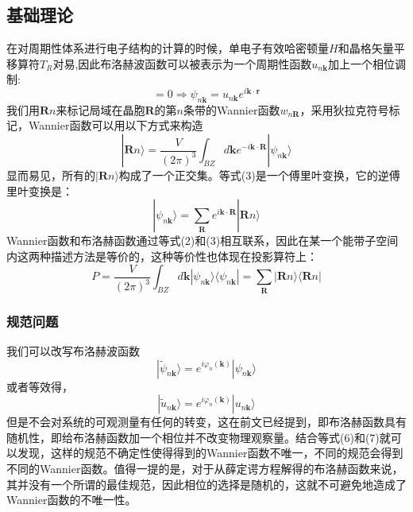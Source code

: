 \subsection{基础理论}
在对周期性体系进行电子结构的计算的时候，单电子有效哈密顿量$H$和晶格矢量平移算符$T_{R}$对易,因此布洛赫波函数可以被表示为一个周期性函数$u_{n\bm{k}}$加上一个相位调制:
\begin{equation}
[H,T_{R}]=0\Rightarrow \psi_{n\bm{k}}=u_{n\bm{k}}e^{i \bm{k} \cdot \bm{r}}
\end{equation}
我们用$\bm{R}n$来标记局域在晶胞$\bm{R}$的第$n$条带的Wannier函数$w_{n\bm{R}}$，采用狄拉克符号标记，Wannier函数可以用以下方式来构造
\begin{equation}
|\bm{R}n \rangle= \frac{V}{(2\pi)^3}\int_{BZ}d\bm{k}e^{-i\bm{k}\cdot\bm{R}}|\psi_{n\bm{k}}\rangle
\end{equation}
显而易见，所有的$|\bm{R}n \rangle$构成了一个正交集。等式(3)是一个傅里叶变换，它的逆傅里叶变换是：
\begin{equation}
|\psi_{n\bm{k}}\rangle= \sum_{\bm{R}}e^{i\bm{k}\cdot\bm{R}}|\bm{R}n \rangle
\end{equation}
Wannier函数和布洛赫函数通过等式(2)和(3)相互联系，因此在某一个能带子空间内这两种描述方法是等价的，这种等价性也体现在投影算符上：
\begin{equation}
P= \frac{V}{(2\pi)^3} \int_{BZ}d\bm{k}  |\psi_{n\bm{k}}\rangle \langle\psi_{n\bm{k}} |=\sum_{\bm{R}}|\bm{R}n \rangle \langle \bm {R}n |
\end{equation}
\subsubsection{规范问题}
我们可以改写布洛赫波函数
\begin{equation}
|\widetilde \psi_{n\bm{k}}\rangle= e^{i \varphi_{n}(\bm{k})} |\psi_{n\bm{k}}\rangle
\end{equation}
或者等效得，
\begin{equation}
|\widetilde u_{n\bm{k}}\rangle= e^{i \varphi_{n}(\bm{k})} |u_{n\bm{k}}\rangle
\end{equation}
但是不会对系统的可观测量有任何的转变，这在前文已经提到，即布洛赫函数具有随机性，即给布洛赫函数加一个相位并不改变物理观察量。结合等式(6)和(7)就可以发现，这样的规范不确定性使得得到的Wannier函数不唯一，不同的规范会得到不同的Wannier函数。值得一提的是，对于从薛定谔方程解得的布洛赫函数来说，其并没有一个所谓的最佳规范，因此相位的选择是随机的，这就不可避免地造成了Wannier函数的不唯一性。
